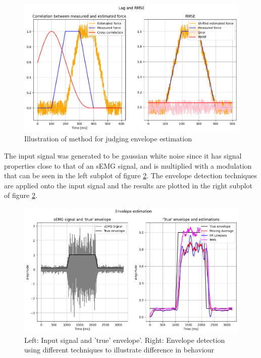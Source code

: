 \begin{figure}[h!t]
	\begin{center}
		\includegraphics[width=1.0\columnwidth]{images/envelope_estimation_method.png}
	\end{center}
	\caption{Illustration of method for judging envelope estimation}
	\label{fig:envelope_estimation_method}
\end{figure}

The input signal was generated to be gaussian white noise since it has signal properties close to that of an sEMG signal, and is multiplied with a modulation that can be seen in the left subplot of figure \ref{fig:envelope_detection}. The envelope detection techniques are applied onto the input signal and the results are plotted in the right subplot of figure \ref{fig:envelope_detection}.

\begin{figure}[h!t]
	\begin{center}
		\includegraphics[width=1.0\columnwidth]{images/envelope_detection.png}
	\end{center}
	\caption{Left: Input signal and 'true' envelope'. Right: Envelope detection using different techniques to illustrate difference in behaviour}
	\label{fig:envelope_detection}
\end{figure}


